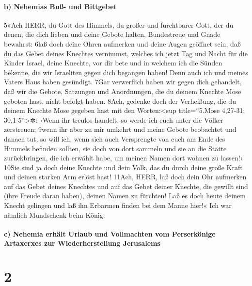 \hypertarget{b-nehemias-buuxdf--und-bittgebet}{%
\paragraph{b) Nehemias Buß- und
Bittgebet}\label{b-nehemias-buuxdf--und-bittgebet}}

5»Ach HERR, du Gott des Himmels, du großer und furchtbarer Gott, der du
denen, die dich lieben und deine Gebote halten, Bundestreue und Gnade
bewahrst: 6laß doch deine Ohren aufmerken und deine Augen geöffnet sein,
daß du das Gebet deines Knechtes vernimmst, welches ich jetzt Tag und
Nacht für die Kinder Israel, deine Knechte, vor dir bete und in welchem
ich die Sünden bekenne, die wir Israeliten gegen dich begangen haben!
Denn auch ich und meines Vaters Haus haben gesündigt. 7Gar verwerflich
haben wir gegen dich gehandelt, daß wir die Gebote, Satzungen und
Anordnungen, die du deinem Knechte Mose geboten hast, nicht befolgt
haben. 8Ach, gedenke doch der Verheißung, die du deinem Knechte Mose
gegeben hast mit den Worten:\textless sup title=``5.Mose 4,27-31;
30,1-5''\textgreater✲: ›Wenn ihr treulos handelt, so werde ich euch
unter die Völker zerstreuen; 9wenn ihr aber zu mir umkehrt und meine
Gebote beobachtet und danach tut, so will ich, wenn sich auch
Versprengte von euch am Ende des Himmels befinden sollten, sie doch von
dort sammeln und sie an die Stätte zurückbringen, die ich erwählt habe,
um meinen Namen dort wohnen zu lassen!‹ 10Sie sind ja doch deine Knechte
und dein Volk, das du durch deine große Kraft und deinen starken Arm
erlöst hast! 11Ach, HERR, laß doch dein Ohr aufmerken auf das Gebet
deines Knechtes und auf das Gebet deiner Knechte, die gewillt sind (ihre
Freude daran haben), deinen Namen zu fürchten! Laß es doch heute deinem
Knecht gelingen und laß ihn Erbarmen finden bei dem Manne hier!« Ich war
nämlich Mundschenk beim König.

\hypertarget{c-nehemia-erhuxe4lt-urlaub-und-vollmachten-vom-perserkuxf6nige-artaxerxes-zur-wiederherstellung-jerusalems}{%
\paragraph{c) Nehemia erhält Urlaub und Vollmachten vom Perserkönige
Artaxerxes zur Wiederherstellung
Jerusalems}\label{c-nehemia-erhuxe4lt-urlaub-und-vollmachten-vom-perserkuxf6nige-artaxerxes-zur-wiederherstellung-jerusalems}}

\hypertarget{section-1}{%
\section{2}\label{section-1}}

